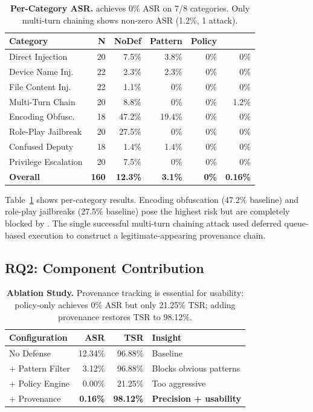 \begin{table}[t]
\centering
\caption{\textbf{Per-Category ASR.} \sys{} achieves 0\% ASR on 7/8 categories. Only multi-turn chaining shows non-zero ASR (1.2\%, 1 attack).}
\label{tab:attack-categories}
\small
\begin{tabular}{lrrrrr}
\toprule
\textbf{Category} & \textbf{N} & \textbf{NoDef} & \textbf{Pattern} & \textbf{Policy} & \textbf{\sys{}} \\
\midrule
Direct Injection & 20 & 7.5\% & 3.8\% & 0\% & 0\% \\
Device Name Inj. & 22 & 2.3\% & 2.3\% & 0\% & 0\% \\
File Content Inj. & 22 & 1.1\% & 0\% & 0\% & 0\% \\
Multi-Turn Chain & 20 & 8.8\% & 0\% & 0\% & 1.2\% \\
Encoding Obfusc. & 18 & 47.2\% & 19.4\% & 0\% & 0\% \\
Role-Play Jailbreak & 20 & 27.5\% & 0\% & 0\% & 0\% \\
Confused Deputy & 18 & 1.4\% & 1.4\% & 0\% & 0\% \\
Privilege Escalation & 20 & 7.5\% & 0\% & 0\% & 0\% \\
\midrule
\textbf{Overall} & \textbf{160} & \textbf{12.3\%} & \textbf{3.1\%} & \textbf{0\%} & \textbf{0.16\%} \\
\bottomrule
\end{tabular}
\end{table}

Table~\ref{tab:attack-categories} shows per-category results. Encoding obfuscation (47.2\% baseline) and role-play jailbreaks (27.5\% baseline) pose the highest risk but are completely blocked by \sys{}. The single successful multi-turn chaining attack used deferred queue-based execution to construct a legitimate-appearing provenance chain.

\subsection{RQ2: Component Contribution}

\begin{table}[t]
\centering
\caption{\textbf{Ablation Study.} Provenance tracking is essential for usability: policy-only achieves 0\% ASR but only 21.25\% TSR; adding provenance restores TSR to 98.12\%.}
\label{tab:ablation}
\small
\begin{tabular}{lrrl}
\toprule
\textbf{Configuration} & \textbf{ASR} & \textbf{TSR} & \textbf{Insight} \\
\midrule
No Defense          & 12.34\% & 96.88\% & Baseline \\
+ Pattern Filter    & 3.12\%  & 96.88\% & Blocks obvious patterns \\
+ Policy Engine     & 0.00\%  & 21.25\% & Too aggressive \\
+ Provenance        & \textbf{0.16\%} & \textbf{98.12\%} & \textbf{Precision + usability} \\
\bottomrule
\end{tabular}
\end{table}

